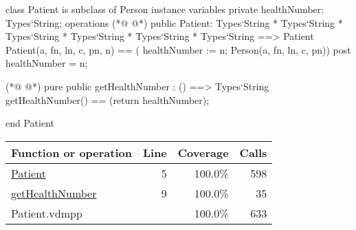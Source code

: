 \begin{vdmpp}[breaklines=true]
class Patient is subclass of Person
instance variables
  private healthNumber: Types`String;
operations
(*@
\label{Patient:5}
@*)
 public Patient: Types`String * Types`String * Types`String * Types`String * Types`String * Types`String ==> Patient
  Patient(a, fn, ln, c, pn, n) == ( healthNumber := n; Person(a, fn, ln, c, pn))
 post healthNumber = n;
 
(*@
\label{getHealthNumber:9}
@*)
 pure public getHealthNumber : () ==> Types`String
  getHealthNumber() == (return healthNumber);

end Patient
\end{vdmpp}
\bigskip
\begin{longtable}{|l|r|r|r|}
\hline
Function or operation & Line & Coverage & Calls \\
\hline
\hline
\hyperref[Patient:5]{Patient} & 5&100.0\% & 598 \\
\hline
\hyperref[getHealthNumber:9]{getHealthNumber} & 9&100.0\% & 35 \\
\hline
\hline
Patient.vdmpp & & 100.0\% & 633 \\
\hline
\end{longtable}

